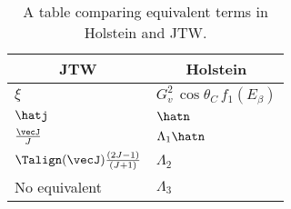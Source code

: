 


\renewcommand{\arraystretch}{1.6}

\begin{table}[h!!!!t]
	\begin{center}
	\begin{tabular}{ | l | l | }
		\multicolumn{1}{c}{JTW} 				& \multicolumn{1}{c}{Holstein}
		\\  \hline
		$\xi$    								& $G_v^2 \, \cos\theta_C \, f_1(E_\beta)$ 
		\\  \hline
		$\hatj$									& $\hatn$ 
		\\  \hline
		$\frac{\vecJ}{J}$ 						& $\Lambda_1\hatn $
		\\  \hline 
		$\Talign(\vecJ) \frac{(2J-1)}{(J+1)}$ 	& $\Lambda_2$
		\\  \hline 
		No equivalent							& $\Lambda_3$
		\\  \hline
	\end{tabular}
	\end{center}
	\caption[Notation Guide]{A table comparing equivalent terms in Holstein and JTW.}
	\label{table:compare_notation_nonotes}
\end{table}

\renewcommand{\arraystretch}{1}
